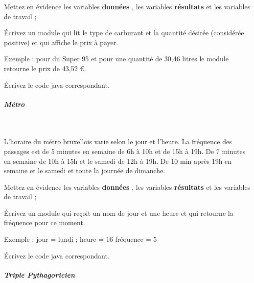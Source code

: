 \documentclass[11pt,a4paper]{article}
\begin{document}
        Mettez en \'evidence les variables \textbf{\guillemotleft  donn\'ees \guillemotright }, 
        les variables \textbf{\guillemotleft  r\'esultats \guillemotright } et les variables de travail ;
      
            \par
        
          \'Ecrivez un module qui lit le type de carburant et la quantit\'e d\'esir\'ee (consid\'er\'ee positive) et qui affiche le prix \`a payer.\par
				
          Exemple : pour du Super 95 et pour une quantit\'e de 30,46 litres le module retourne le prix de 43,52 €.
        
            \par
        \'Ecrivez le code java correspondant.
            \par
        
			
		\subparagraph{M\'etro} 
		
					\textcolor{white}{.} \par
				
          L'horaire du m\'etro bruxellois varie selon le jour et l'heure. La fr\'equence des passages est de 5
          minutes en semaine de 6h \`a 10h et de 15h \`a 19h. De 7 minutes en semaine de 10h \`a 15h et le
          samedi de 12h \`a 19h. De 10 min apr\`es 19h en semaine et le samedi et toute la journ\'ee de
          dimanche. 
        
            \par
        
          Mettez en \'evidence les variables \textbf{\guillemotleft  donn\'ees \guillemotright }, 
          les variables \textbf{\guillemotleft  r\'esultats \guillemotright } et les variables de travail ;
        
            \par
        
          \'Ecrivez un module qui re\c coit un nom de jour et une heure et qui retourne la fr\'equence pour ce moment. \par
				
          Exemple : jour = \guillemotleft  lundi \guillemotright  ; heure = 16 fr\'equence = 5
        
            \par
        \'Ecrivez le code java correspondant.
            \par
        
			
		\subparagraph{Triple Pythagoricien} 
		
\end{document}
